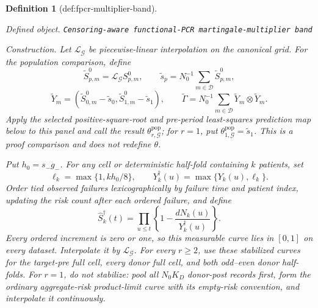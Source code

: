 \documentclass{article}
\newtheorem{definition}{Definition}
\begin{document}
\begin{definition}[def:fpcr-multiplier-band]\label{def:fpcr-multiplier-band}
\par\smallskip\noindent\emph{Defined object.} \texttt{Censoring-\allowbreak{}aware functional-\allowbreak{}PCR martingale-\allowbreak{}multiplier band}
\par\smallskip\noindent\emph{Construction.} Let \(\mathcal L_{\mathcal G}\) be piecewise-linear interpolation on the canonical grid. For the population comparison, define
\[
 \widetilde S^0_{p,m}=\mathcal L_{\mathcal G}S^0_{p,m},\qquad
 \widetilde s_p=N_0^{-1}\sum_{m\in\mathcal D}\widetilde S^0_{p,m},
\]
\[
 \widetilde Y_m=(\widetilde S^0_{0,m}-\widetilde s_0,
                  \widetilde S^0_{1,m}-\widetilde s_1),\qquad
 \widetilde\Gamma=N_0^{-1}\sum_{m\in\mathcal D}
 \widetilde Y_m\otimes\widetilde Y_m.
\]
Apply the selected positive-square-root and pre-period least-squares prediction map below to this panel and call the result \(\theta^{\mathrm{pop}}_{r,\mathcal G}\); for \(r=1\), put \(\theta^{\mathrm{pop}}_{1,\mathcal G}=\widetilde s_1\). This is a proof comparison and does not redefine \(\theta\).

Put \(h_0=s_-g_-\). For any cell or deterministic half-fold containing \(k\) patients, set
\[
 \ell_k=\max\{1,kh_0/8\},\qquad
 Y_k^\dagger(u)=\max\{Y_k(u),\ell_k\}.
\]
Order tied observed failures lexicographically by failure time and patient index, updating the risk count after each ordered failure, and define
\[
 \widehat S_k^\dagger(t)=
 \prod_{u\le t}\left\{1-\frac{dN_k(u)}{Y_k^\dagger(u)}\right\}.
\]
Every ordered increment is zero or one, so this measurable curve lies in \([0,1]\) on every dataset. Interpolate it by \(\mathcal L_{\mathcal G}\). For every \(r\ge2\), use these stabilized curves for the target-pre full cell, every donor full cell, and both odd--even donor half-folds. For \(r=1\), do not stabilize: pool all \(N_0K_D\) donor-post records first, form the ordinary aggregate-risk product-limit curve with its empty-risk convention, and interpolate it continuously.


\end{definition}
\end{document}
